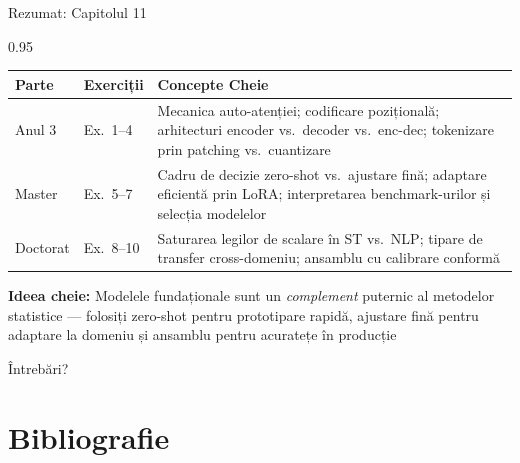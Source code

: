 \documentclass[9pt, aspectratio=169, t]{beamer}
\begin{document}
\begin{frame}{Rezumat: Capitolul 11}
    \begin{cminipage}{0.95\textwidth}
    {\footnotesize
    \begin{center}
    \begin{tabular}{p{2.2cm}p{2.5cm}p{7.5cm}}
        \toprule
        \textbf{Parte} & \textbf{Exerciții} & \textbf{Concepte Cheie} \\
        \midrule
        Anul 3 & Ex.\ 1--4 & Mecanica auto-atenției; codificare pozițională; arhitecturi encoder vs.\ decoder vs.\ enc-dec; tokenizare prin patching vs.\ cuantizare \\[4pt]
        Master & Ex.\ 5--7 & Cadru de decizie zero-shot vs.\ ajustare fină; adaptare eficientă prin LoRA; interpretarea benchmark-urilor și selecția modelelor \\[4pt]
        Doctorat & Ex.\ 8--10 & Saturarea legilor de scalare în ST vs.\ NLP; tipare de transfer cross-domeniu; ansamblu cu calibrare conformă \\
        \bottomrule
    \end{tabular}
    \end{center}

    {\scriptsize \textbf{Ideea cheie:} Modelele fundaționale sunt un \textit{complement} puternic al metodelor statistice --- folosiți zero-shot pentru prototipare rapidă, ajustare fină pentru adaptare la domeniu și ansamblu pentru acuratețe în producție}
    }

    \vspace{0.2cm}
    \begin{center}
        \Large\textcolor{MainBlue}{Întrebări?}
    \end{center}
    \end{cminipage}
\end{frame}

\section{Bibliografie}
\end{document}

